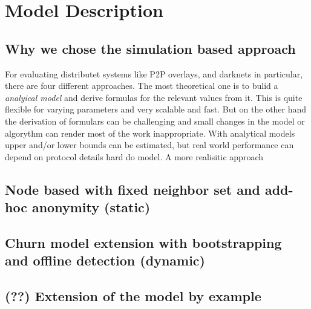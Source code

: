 \chapter{Model Description}

\section{Why we chose the simulation based approach}

For evaluating distributet systems like P2P overlays, and darknets in particular, there are four different approaches. The most theoretical one is to bulid a \emph{analyical model} and derive formulas for the relevant values from it. This is quite flexible for varying parameters and very scalable and fast. But on the other hand the derivation of formulars can be challenging and small changes in the model or algorythm can render most of the work inappropriate. With analytical models upper and/or lower bounds can be estimated, but real world performance can depend on protocol details hard do model.
A more realisitic approach 


\section{Node based with fixed neighbor set and add-hoc anonymity (static)}



\section{Churn model extension with bootstrapping and offline detection (dynamic)}
\section{(??) Extension of the model by example}
